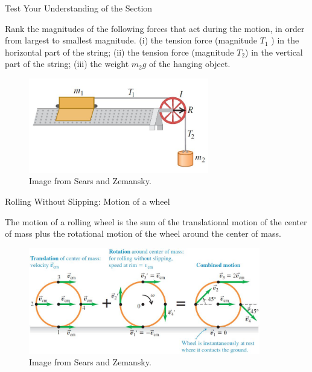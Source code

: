 \documentclass[]{beamer}
\begin{document}




\begin{frame}


  Test Your Understanding of the Section
  \vspace{7mm}

Rank the magnitudes of the following forces that act during the motion, in
  order from largest to smallest magnitude. (i) the tension force (magnitude $T_1$ ) in the horizontal
  part of the string; (ii) the tension force (magnitude $T_2$) in the vertical part of the
  string; (iii) the weight $m_2g$ of the hanging object.


  \begin{figure}[h!]  
    \includegraphics[width=0.7\textwidth]{images/8.jpg}
    \caption{Image from Sears and Zemansky. }
  \end{figure}



\end{frame}







\begin{frame}


  Rolling Without Slipping: Motion of a wheel
  \vspace{7mm}

  The motion of a rolling wheel is   the sum of the translational motion of the
  center of mass plus the rotational motion   of the wheel around the center of mass.


  
  \begin{figure}[h!]  
    \includegraphics[width=0.9\textwidth]{images/9.jpg}
    \caption{Image from Sears and Zemansky. }
  \end{figure}

\end{frame}
\end{document}
